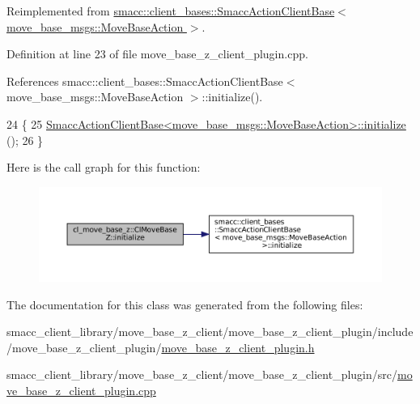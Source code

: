 Reimplemented from \hyperlink{classsmacc_1_1client__bases_1_1SmaccActionClientBase_a72967f255f85e35718a1e1b0b48c38ff}{smacc\+::client\+\_\+bases\+::\+Smacc\+Action\+Client\+Base$<$ move\+\_\+base\+\_\+msgs\+::\+Move\+Base\+Action $>$}.



Definition at line 23 of file move\+\_\+base\+\_\+z\+\_\+client\+\_\+plugin.\+cpp.



References smacc\+::client\+\_\+bases\+::\+Smacc\+Action\+Client\+Base$<$ move\+\_\+base\+\_\+msgs\+::\+Move\+Base\+Action $>$\+::initialize().


\begin{DoxyCode}
24 \{
25     \hyperlink{classsmacc_1_1client__bases_1_1SmaccActionClientBase_a72967f255f85e35718a1e1b0b48c38ff}{SmaccActionClientBase<move\_base\_msgs::MoveBaseAction>::initialize}
      ();
26 \}
\end{DoxyCode}
Here is the call graph for this function\+:
\nopagebreak
\begin{figure}[H]
\begin{center}
\leavevmode
\includegraphics[width=350pt]{classcl__move__base__z_1_1ClMoveBaseZ_a7572804edd84a956967b9f8cf2d4081e_cgraph}
\end{center}
\end{figure}


The documentation for this class was generated from the following files\+:\begin{DoxyCompactItemize}
\item 
smacc\+\_\+client\+\_\+library/move\+\_\+base\+\_\+z\+\_\+client/move\+\_\+base\+\_\+z\+\_\+client\+\_\+plugin/include/move\+\_\+base\+\_\+z\+\_\+client\+\_\+plugin/\hyperlink{move__base__z__client__plugin_8h}{move\+\_\+base\+\_\+z\+\_\+client\+\_\+plugin.\+h}\item 
smacc\+\_\+client\+\_\+library/move\+\_\+base\+\_\+z\+\_\+client/move\+\_\+base\+\_\+z\+\_\+client\+\_\+plugin/src/\hyperlink{move__base__z__client__plugin_8cpp}{move\+\_\+base\+\_\+z\+\_\+client\+\_\+plugin.\+cpp}\end{DoxyCompactItemize}
